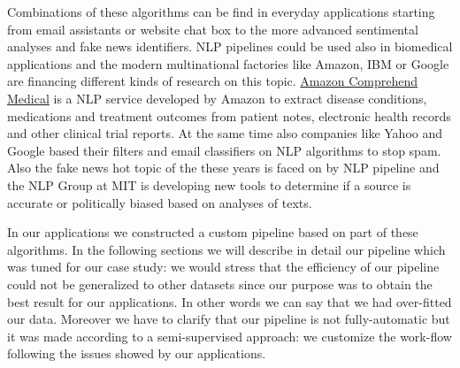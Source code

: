 \documentclass{standalone}
\begin{document}
Combinations of these algorithms can be find in everyday applications starting from email assistants or website chat box to the more advanced sentimental analyses and fake news identifiers.
NLP pipelines could be used also in biomedical applications and the modern multinational factories like Amazon, IBM or Google are financing different kinds of research on this topic.
\href{https://aws.amazon.com/it/comprehend/medical/}{Amazon Comprehend Medical} is a NLP service developed by Amazon to extract disease conditions, medications and treatment outcomes from patient notes, electronic health records and other clinical trial reports.
At the same time also companies like Yahoo and Google based their filters and email classifiers on NLP algorithms to stop spam.
Also the fake news hot topic of the these years is faced on by NLP pipeline and the NLP Group at MIT is developing new tools to determine if a source is accurate or politically biased based on analyses of texts.

In our applications we constructed a custom pipeline based on part of these algorithms.
In the following sections we will describe in detail our pipeline which was tuned for our case study: we would stress that the efficiency of our pipeline could not be generalized to other datasets since our purpose was to obtain the best result for our applications.
In other words we can say that we had over-fitted our data.
Moreover we have to clarify that our pipeline is not fully-automatic but it was made according to a semi-supervised approach: we customize the work-flow following the issues showed by our applications.
\end{document}
